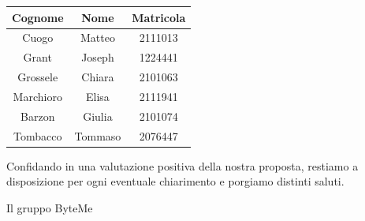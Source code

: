 \documentclass[11pt,a4paper]{article}
\begin{document}
\begin{table}[H]
    \centering
    \begin{tabular}{|c|c|c|}
        \hline
        \textbf{Cognome} & \textbf{Nome} & \textbf{Matricola} \\
        \hline
        Cuogo & Matteo & 2111013 \\
        \hline
        Grant & Joseph & 1224441 \\
        \hline
        Grossele & Chiara & 2101063 \\
        \hline
        Marchioro & Elisa & 2111941 \\
        \hline
        Barzon & Giulia & 2101074 \\
        \hline
        Tombacco & Tommaso & 2076447 \\
        \hline
    \end{tabular}
\end{table}

\noindent Confidando in una valutazione positiva della nostra proposta, restiamo a disposizione per ogni eventuale chiarimento e porgiamo distinti saluti.

\hfill Il gruppo ByteMe
\end{document}
